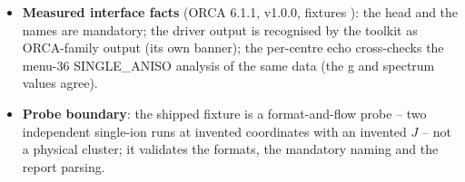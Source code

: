 \begin{readbox}
\begin{itemize}
    isotropic spins; one Ising plus one isotropic spin; two Ising spins)
    and approximate otherwise; the dipole-dipole coupling is evaluated
    exactly from the ab initio moments and usually dominates in strongly
    anisotropic lanthanides (manual section 7.18).
  \item \textbf{Measured interface facts} (ORCA 6.1.1,
     v1.0.0, fixtures ): the
     head and the  names are
    mandatory; the driver output is recognised by the toolkit as
    ORCA-family output (its own banner); the per-centre echo cross-checks
    the menu-36 SINGLE\_ANISO analysis of the same data (the g and
    spectrum values agree).
  \item \textbf{Probe boundary}: the shipped fixture is a format-and-flow
    probe -- two independent single-ion runs at invented coordinates with
    an invented $J$ -- not a physical cluster; it validates the formats,
    the mandatory naming and the report parsing.
\end{itemize}
\end{readbox}
